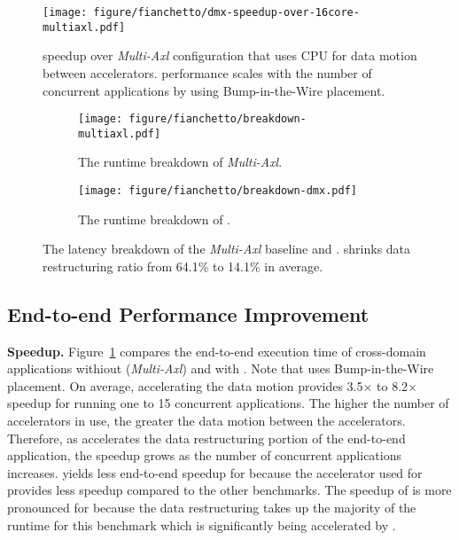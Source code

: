 \begin{figure}[ht!]
    \centering
    \texttt{[image: figure/fianchetto/dmx-speedup-over-16core-multiaxl.pdf]}
    \caption{\dmx speedup over \emph{Multi-Axl} configuration that uses CPU for data motion between accelerators. \dmx performance scales with the number of concurrent applications by using Bump-in-the-Wire \drx placement.
    }
    \label{fig:res:speedup}
\end{figure}

\begin{figure}[t!]
%
\begin{subfigure}[ht!]{\columnwidth}
\texttt{[image: figure/fianchetto/breakdown-multiaxl.pdf]}
\caption{The runtime breakdown of \emph{Multi-Axl}.}
\label{fig:res:breakdown-multiaxl}
\end{subfigure}
%
\begin{subfigure}[t!]{\columnwidth}
\texttt{[image: figure/fianchetto/breakdown-dmx.pdf]}
\caption{The runtime breakdown of \dmx.}
\label{fig:res:breakdown-dmx}
\end{subfigure}
%
\caption{The latency breakdown of the \emph{Multi-Axl} baseline and \dmx. \dmx shrinks data restructuring ratio from 64.1\% to 14.1\% in average.}
\label{fig:res:breakdown}
\end{figure}

\subsection{End-to-end Performance Improvement} 
\label{sec:results:e2e_metrics}

\noindent \textbf{Speedup.}
%
Figure~\ref{fig:res:speedup} compares the end-to-end execution time of cross-domain applications withiout (\emph{Multi-Axl}) and with \dmx. Note that \dmx uses Bump-in-the-Wire \drx placement. 
%
On average, accelerating the data motion provides 3.5$\times$ to 8.2$\times$ speedup for running one to 15 concurrent applications.
%
The higher the number of accelerators in use, the greater the data motion between the accelerators. %
%
Therefore, as \drx accelerates the data restructuring portion of the end-to-end application, the speedup grows as the number of concurrent applications increases.
%
\dmx yields less end-to-end speedup for \vs because the accelerator used for \vs provides less speedup compared to the other benchmarks. 
%
The speedup of \dmx is more pronounced for \dhj because the data restructuring takes up the majority of the runtime for this benchmark which is significantly being accelerated by \drx. 
%

